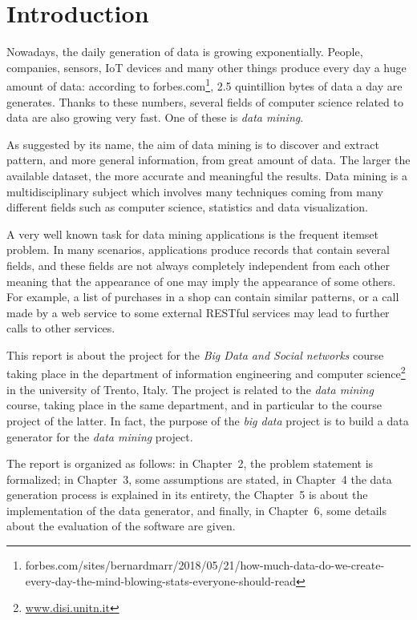 \documentclass{acm_proc_article-sp-sigmod09}
\begin{document}


\section{Introduction}
Nowadays, the daily generation of data is growing exponentially. People, companies, sensors, IoT devices and many other things produce every day a huge amount of data: according to forbes.com\footnote{forbes.com/sites/bernardmarr/2018/05/21/how-much-data-do-we-create-every-day-the-mind-blowing-stats-everyone-should-read}, 2.5 quintillion bytes of data a day are generates. Thanks to these numbers, several fields of computer science related to data are also growing very fast. One of these is \emph{data mining}.

As suggested by its name, the aim of data mining is to discover and extract pattern, and more general information, from great amount of data. The larger the available dataset, the more accurate and meaningful the results. Data mining is a multidisciplinary subject which involves many techniques coming from many different fields such as computer science, statistics and data visualization.

A very well known task for data mining applications is the frequent itemset problem. In many scenarios, applications produce records that contain several fields, and these fields are not always completely independent from each other meaning that the appearance of one may imply the appearance of some others. For example, a list of purchases in a shop can contain similar patterns, or a call made by a web service to some external RESTful services may lead to further calls to other services.

This report is about the project for the \emph{Big Data and Social networks} course taking place in the department of information engineering and computer science\footnote{\url{www.disi.unitn.it}} in the university of Trento, Italy. The project is related to the \emph{data mining} course, taking place in the same department, and in particular to the course project of the latter. In fact, the purpose of the \emph{big data} project is to build a data generator for the \emph{data mining} project.

The report is organized as follows: in Chapter~2, the problem statement is formalized; in Chapter~3, some assumptions are stated, in Chapter~4 the data generation process is explained in its entirety, the Chapter~5 is about the implementation of the data generator, and finally, in Chapter~6, some details about the evaluation of the software are given.
\end{document}
